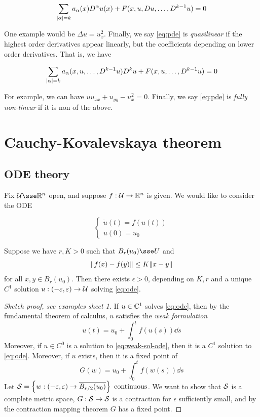 \documentclass{article}
\begin{document}
\[\sum_{\abs{\alpha} = k}a_\alpha(x)D^\alpha u(x) + F(x, u, Du, \dots, D^{k-1}u) = 0\]

One example would be \(\Delta u = u_x^2\). Finally, we say \cref{eq:pde} is \emph{quasilinear} if the highest order derivatives appear linearly, but the coefficients depending on lower order derivatives. That is, we have

\[\sum_{\abs{\alpha} = k}a_\alpha(x, u, \dots, D^{k-1}u)D^k u + F(x, u, \dots, D^{k-1}u) = 0\]

For example, we can have \(u u_{xx} + u_{yy} - u_x^2 = 0\). Finally, we say \cref{eq:pde} is \emph{fully non-linear} if it is non of the above.

\section{Cauchy-Kovalevskaya theorem}

\subsection{ODE theory}

Fix \(\mcU \sse \R^n\) open, and suppose \(f : \mathcal{U} \to \mathbb{R}^n\) is given. We would like to consider the ODE

\begin{equation}
    \label{eq:ode}
    \begin{cases}
        \dot u(t) = f(u(t)) \\
        u(0) = u_0
    \end{cases}
\end{equation}

\begin{theorem}
     Suppose we have \(r, K > 0\) such that \(B_r(u_0) \sse U\) and
    \[\norm{f(x) - f(y)} \le K\norm{x - y}\]
    for all \(x, y \in B_r(u_0)\). Then there exists \(\epsilon > 0\), depending on \(K, r\) and a unique \(C^1\) solution \(u : (-\varepsilon, \varepsilon) \to \mathcal{U}\) solving \cref{eq:ode}.
\end{theorem}

\lec

\begin{proof}
    [Sketch proof, see examples sheet 1] If \(u \in \mathbb{C}^1\) solves \cref{eq:ode}, then by the fundamental theorem of calculus, \(u\) satisfies the \emph{weak formulation}
    \begin{equation}
        \label{eq:weak-sol-ode}
        u(t) = u_0 + \int_0^t f(u(s))\dd s
    \end{equation}
    Moreover, if \(u \in C^0\) is a solution to \cref{eq:weak-sol-ode}, then it is a \(C^1\) solution to \cref{eq:ode}. Moreover, if \(u\) exists, then it is a fixed point of
    \[G(w) = u_0 + \int_0^t f(w(s))\dd s\]
    Let \(\mathcal{S} = \left\{w : (-\varepsilon, \varepsilon) \to \overline{B_{r/2}(u_0)}\right\} \text{ continuous}\). We want to show that \(\mathcal{S}\) is a complete metric space, \(G : \mathcal{S} \to \mathcal{S}\) is a contraction for \(\epsilon\) sufficiently small, and by the contraction mapping theorem \(G\) has a fixed point.
\end{proof}
\end{document}

